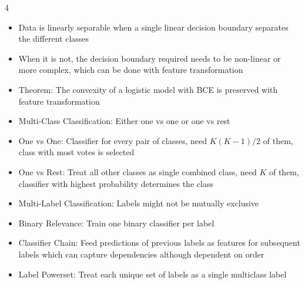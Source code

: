 \documentclass[10pt, landscape]{article}
\begin{document}
\begin{multicols*}{4}
\begin{itemize}
    \item Data is linearly separable when a single linear decision boundary separates the different classes
    \item When it is not, the decision boundary required needs to be non-linear or more complex, which can be done with feature transformation
    \item Theorem: The convexity of a logistic model with BCE is preserved with feature transformation
    \item Multi-Class Classification: Either one vs one or one vs rest
    \item One vs One: Classifier for every pair of classes, need $K(K-1)/2$ of them, class with most votes is selected
    \item One vs Rest: Treat all other classes as single combined class, need $K$ of them, classifier with highest probability determines the class
    \item Multi-Label Classification: Labels might not be mutually exclusive
    \item Binary Relevance: Train one binary classifier per label
    \item Classifier Chain: Feed predictions of previous labels as features for subsequent labels which can capture dependencies although dependent on order
    \item Label Powerset: Treat each unique set of labels as a single multiclass label
\end{itemize}


\end{multicols*}
\end{document}
